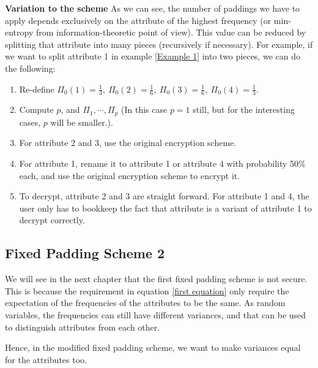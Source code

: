 \documentclass[10pt]{book}
\begin{document}
\textbf{Variation to the scheme} As we can see, the number of paddings we have to apply depends exclusively on the attribute of the highest frequency (or min-entropy from information-theoretic point of view). This value can be reduced by splitting that attribute into many pieces (recursively if necessary). For example, if we want to split attribute 1 in example \ref{Example 1} into two pieces, we can do the following:
\begin{enumerate}
\item Re-define $\Pi_0(1) = \frac{1}{3}, \ \Pi_0(2) = \frac{1}{6}, \ \Pi_0(3) = \frac{1}{6}, \ \Pi_0(4) = \frac{1}{3}$.
\item Compute $p$, and $\Pi_1, \cdots, \Pi_p$ (In this case $p = 1$ still, but for the interesting cases, $p$ will be smaller.).
\item For attribute 2 and 3, use the original encryption scheme.
\item For attribute 1, rename it to attribute 1 or attribute 4 with probability 50\% each, and use the original encryption scheme to encrypt it.
\item To decrypt, attribute 2 and 3 are straight forward. For attribute 1 and 4, the user only has to bookkeep the fact that attribute is a variant of attribute 1 to decrypt correctly.
\end{enumerate}


\subsection{Fixed Padding Scheme 2}
We will see in the next chapter that the first fixed padding scheme is not secure. This is because the requirement in equation \ref{first equation} only require the expectation of the frequencies of the attributes to be the same. As random variables, the frequencies can still have different variances, and that can be used to distinguish attributes from each other.

Hence, in the modified fixed padding scheme, we want to make variances equal for the attributes too.











{}
\end{document}

